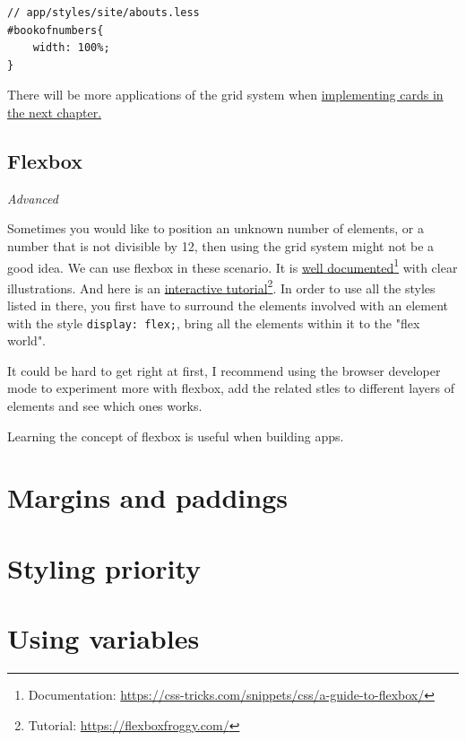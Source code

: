 \begin{lstlisting}[language=pug]
// app/styles/site/abouts.less
#bookofnumbers{
    width: 100%;
}
\end{lstlisting}

There will be more applications of the grid system when \hyperref[sec:cards]{implementing cards in the next chapter.}
\subsection{Flexbox}
\label{sec:flexbox}

\textit{Advanced}
\vspace{6mm}

Sometimes you would like to position an unknown number of elements, or a number that is not divisible by 12, then using the grid system might not be a good idea. We can use flexbox in these scenario. It is \href{https://css-tricks.com/snippets/css/a-guide-to-flexbox/}{well documented}\footnote{Documentation: \url{https://css-tricks.com/snippets/css/a-guide-to-flexbox/}} with clear illustrations. And here is an \href{https://flexboxfroggy.com/}{interactive tutorial}\footnote{Tutorial: \url{https://flexboxfroggy.com/}}. In order to use all the styles listed in there, you first have to surround the elements involved with an element with the style \texttt{display: flex;}, bring all the elements within it to the "flex world".

It could be hard to get right at first, I recommend using the browser developer mode to experiment more with flexbox, add the related stles to different layers of elements and see which ones works. 

Learning the concept of flexbox is useful when building apps.

\section{Margins and paddings}
\label{sec:marginpadding}
\label{sec:margin}

\section{Styling priority}
\label{sec:stylingpriority}

\section{Using variables}
